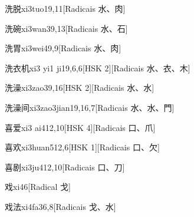 \begin{entry}{洗脱}{xi3tuo1}{9,11}[Radicais ⽔、⾁]
\end{entry}

\begin{entry}{洗碗}{xi3wan3}{9,13}[Radicais ⽔、⽯]
\end{entry}

\begin{entry}{洗胃}{xi3wei4}{9,9}[Radicais ⽔、⾁]
\end{entry}

\begin{entry}{洗衣机}{xi3 yi1 ji1}{9,6,6}[HSK 2][Radicais ⽔、⾐、⽊]
\end{entry}

\begin{entry}{洗澡}{xi3zao3}{9,16}[HSK 2][Radicais ⽔、⽔]
\end{entry}

\begin{entry}{洗澡间}{xi3zao3jian1}{9,16,7}[Radicais ⽔、⽔、⾨]
\end{entry}

\begin{entry}{喜爱}{xi3 ai4}{12,10}[HSK 4][Radicais ⼝、⽖]
\end{entry}

\begin{entry}{喜欢}{xi3huan5}{12,6}[HSK 1][Radicais ⼝、⽋]
\end{entry}

\begin{entry}{喜剧}{xi3ju4}{12,10}[Radicais ⼝、⼑]
\end{entry}

\begin{entry}{戏}{xi4}{6}[Radical ⼽]
\end{entry}

\begin{entry}{戏法}{xi4fa3}{6,8}[Radicais ⼽、⽔]
\end{entry}

